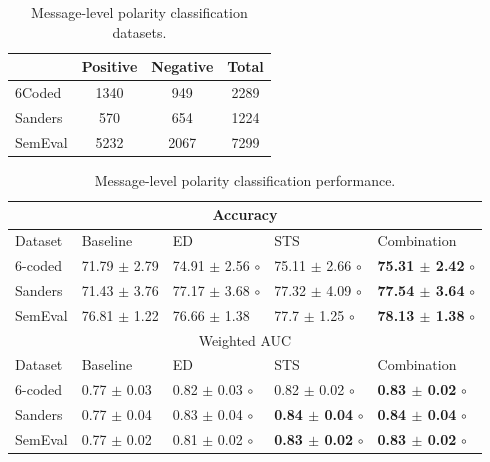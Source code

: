 \documentclass{sig-alternate}
\begin{document}
 \begin{table}[htbp]
\begin{center}
\begin{tabular}{l|c|c|c}
\hline
 & Positive & Negative & Total \\ \hline
6Coded & 1340 & 949 & 2289 \\ 
Sanders & 570 & 654 & 1224 \\ 
SemEval & 5232 & 2067 & 7299 \\ \hline
\end{tabular}
\end{center}
\caption{Message-level polarity classification datasets.}
\label{tab:polcorpus}
\end{table} 
  
\begin{table}[htbp]
\begin{center}
\begin{tabular}{l|l|l|l|l}
\hline \hline
\multicolumn{ 5}{c}{Accuracy } \\ \hline \hline
Dataset & Baseline & ED & STS & Combination \\ \hline
6-coded & 71.79 $\pm$ 2.79 & 74.91 $\pm$ 2.56 $\circ$ & 75.11 $\pm$ 2.66 $\circ$ &  \textbf{75.31 $\pm$ 2.42} $\circ$ \\ 
Sanders & 71.43 $\pm$ 3.76 & 77.17 $\pm$ 3.68 $\circ$ & 77.32 $\pm$ 4.09 $\circ$ &  \textbf{77.54 $\pm$ 3.64} $\circ$ \\ 
SemEval & 76.81 $\pm$ 1.22 & 76.66 $\pm$ 1.38 & 77.7 $\pm$ 1.25 $\circ$ & \textbf{78.13 $\pm$ 1.38} $\circ$ \\ \hline \hline
\multicolumn{ 5}{c}{Weighted AUC } \\ \hline \hline
Dataset & Baseline & ED & STS & Combination \\ \hline
6-coded & 0.77 $\pm$ 0.03 & 0.82 $\pm$ 0.03 $\circ$ & 0.82 $\pm$ 0.02 $\circ$ &  \textbf{0.83 $\pm$ 0.02} $\circ$ \\ 
Sanders & 0.77 $\pm$ 0.04 & 0.83 $\pm$ 0.04 $\circ$ & \textbf{0.84 $\pm$ 0.04} $\circ$  & \textbf{0.84 $\pm$ 0.04} $\circ$ \\ 
SemEval & 0.77 $\pm$ 0.02 & 0.81 $\pm$ 0.02 $\circ$ & \textbf{0.83 $\pm$ 0.02} $\circ$ &  \textbf{0.83 $\pm$ 0.02} $\circ$ \\ \hline
\end{tabular}
\caption{Message-level polarity classification performance.}
\label{tab:messclass}
\end{center}
\end{table}
\end{document}
